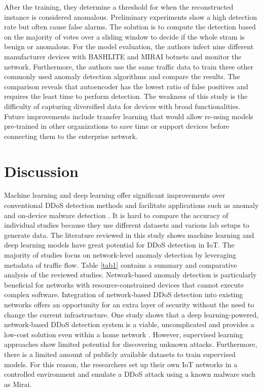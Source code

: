 \documentclass[conference, 11pt]{IEEEtran}
\begin{document}
    After the training, they determine a threshold for when the reconstructed instance is considered anomalous.
    Preliminary experiments show a high detection rate but often cause false alarms.
    The solution is to compute the detection based on the majority of votes over a sliding window to decide if the whole stram is benign or anomalous.
    For the model evaluation, the authors infect nine different manufacturer devices with BASHLITE and MIRAI botnets and monitor the network.
    Furthermore, the authors use the same traffic data to train three other commonly used anomaly detection algorithms and compare the results.
    The comparison reveals that autoencoder has the lowest ratio of false positives and requires the least time to perform detection.
    The weakness of this study is the difficulty of capturing diversified data for devices with broad functionalities.
    Future improvements include transfer learning that would allow re-using models pre-trained in other organizations to save time or support devices before connecting them to the enterprise network.


    \section{Discussion}
    Machine learning and deep learning offer significant improvements over conventional DDoS detection methods and facilitate applications such as anomaly and on-device malware detection \cite{article:15}.
    It is hard to compare the accuracy of individual studies because they use different datasets and various lab setups to generate data.
    The literature reviewed in this study shows machine learning and deep learning models have great potential for DDoS detection in IoT.
    The majority of studies focus on network-level anomaly detection by leveraging metadata of traffic flow.
    Table \ref{tab1} contains a summary and comparative analysis of the reviewed studies.
    Network-based anomaly detection is particularly beneficial for networks with resource-constrained devices that cannot execute complex software.
    Integration of network-based DDoS detection into existing networks offers an opportunity for an extra layer of security without the need to change the current infrastructure.
    One study shows that a deep learning-powered, network-based DDoS detection system is a viable, uncomplicated and provides a low-cost solution even within a home network \cite{inproceedings:1}.
    However, supervised learning approaches show limited potential for discovering unknown attacks.
    Furthermore, there is a limited amount of publicly available datasets to train supervised models.
    For this reason, the researchers set up their own IoT networks in a controlled environment and emulate a DDoS attack using a known malware such as Mirai.
\end{document}
